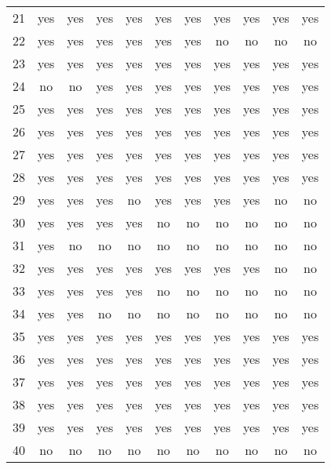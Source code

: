 \documentclass[12pt]{article}
\begin{document}
\begin{tabular}{c | c | c | c | c | c | c | c | c | c | c}
		21 & yes & yes & yes & yes & yes & yes & yes & yes & yes & yes \\
		22 & yes & yes & yes & yes & yes & yes & no  & no  & no  & no  \\
		23 & yes & yes & yes & yes & yes & yes & yes & yes & yes & yes \\
		24 & no  & no  & yes & yes & yes & yes & yes & yes & yes & yes \\
		25 & yes & yes & yes & yes & yes & yes & yes & yes & yes & yes \\
		26 & yes & yes & yes & yes & yes & yes & yes & yes & yes & yes \\
		27 & yes & yes & yes & yes & yes & yes & yes & yes & yes & yes \\
		28 & yes & yes & yes & yes & yes & yes & yes & yes & yes & yes \\
		29 & yes & yes & yes & no  & yes & yes & yes & yes & no  & no  \\
		30 & yes & yes & yes & yes & no  & no  & no  & no  & no  & no  \\
		31 & yes & no  & no  & no  & no  & no  & no  & no  & no  & no  \\
		32 & yes & yes & yes & yes & yes & yes & yes & yes & no  & no  \\
		33 & yes & yes & yes & yes & no  & no  & no  & no  & no  & no  \\
		34 & yes & yes & no  & no  & no  & no  & no  & no  & no  & no  \\
		35 & yes & yes & yes & yes & yes & yes & yes & yes & yes & yes \\
		36 & yes & yes & yes & yes & yes & yes & yes & yes & yes & yes \\
		37 & yes & yes & yes & yes & yes & yes & yes & yes & yes & yes \\
		38 & yes & yes & yes & yes & yes & yes & yes & yes & yes & yes \\
		39 & yes & yes & yes & yes & yes & yes & yes & yes & yes & yes \\
		40 & no  & no  & no  & no  & no  & no  & no  & no  & no  & no  \\
	\end{tabular}
\end{document}
